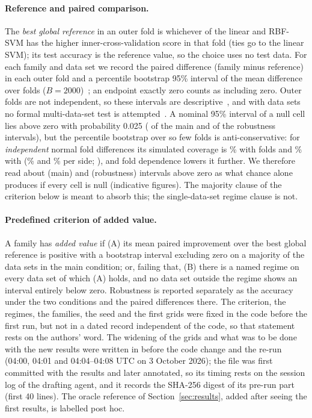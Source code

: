 \documentclass[11pt,a4paper]{article}
\theoremstyle{plain}
\theoremstyle{definition}
\theoremstyle{remark}
\begin{document}
\paragraph{Reference and paired comparison.} The \emph{best global reference} in an outer fold is whichever of the linear and RBF-SVM has the higher inner-cross-validation score in that fold (ties go to the linear SVM); its test accuracy is the reference value, so the choice uses no test data. For each family and data set we record the paired difference (family minus reference) in each outer fold and a percentile bootstrap 95\% interval of the mean difference over folds ($B=2000$)~\citep{efron1993}; an endpoint exactly zero counts as including zero. Outer folds are not independent, so these intervals are descriptive~\citep{dietterich1998,nadeau2003}, and with \NDatasets{} data sets no formal multi-data-set test is attempted~\citep{demsar2006}. A nominal 95\% interval of a null cell lies above zero with probability 0.025 (\ExpectedPosMainNominal{} of the \NCellsMain{} main and \ExpectedPosRobustNominal{} of the \NRobustCells{} robustness intervals), but the percentile bootstrap over so few folds is anti-conservative: for \emph{independent} normal fold differences its simulated coverage is \CovTen\% with \NMainFolds{} folds and \CovFive\% with \NRobFolds{} (\OneSidedTen\% and \OneSidedFive\% per side; ), and fold dependence lowers it further. We therefore read about \ExpectedPosMain{} (main) and \ExpectedPosRobust{} (robustness) intervals above zero as what chance alone produces if every cell is null (indicative figures). The majority clause of the criterion below is meant to absorb this; the single-data-set regime clause is not.

\paragraph{Predefined criterion of added value.} A family has \emph{added value} if (A) its mean paired improvement over the best global reference is positive with a bootstrap interval excluding zero on a majority of the \NDatasets{} data sets in the main condition; or, failing that, (B) there is a named regime on every data set of which (A) holds, and no data set outside the regime shows an interval entirely below zero. Robustness is reported separately as the accuracy under the two conditions and the paired differences there. The criterion, the regimes, the families, the seed and the first grids were fixed in the code before the first run, but not in a dated record independent of the code, so that statement rests on the authors' word. The widening of the grids and what was to be done with the new results were written in  before the code change and the re-run (04:00, 04:01 and 04:04--04:08 UTC on 3 October 2026); the file was first committed with the results and later annotated, so its timing rests on the session log of the drafting agent, and it records the SHA-256 digest of its pre-run part (first 40 lines). The oracle reference of Section~\ref{sec:results}, added after seeing the first results, is labelled post hoc.
\end{document}
